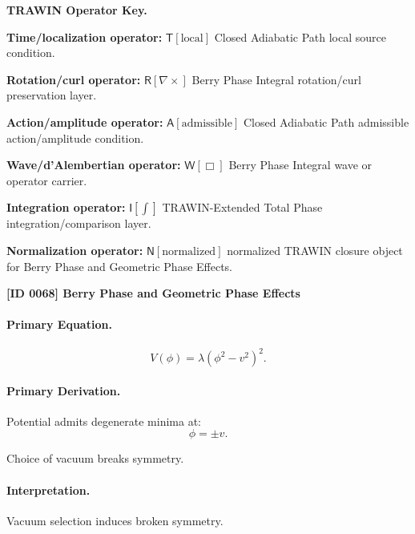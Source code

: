 \par\vspace{0.45\baselineskip}
\noindent\begin{minipage}[t]{\linewidth}
\begingroup
\small
\raggedright
\textbf{TRAWIN Operator Key.}\par
\noindent\textbf{Time/localization operator:} $\mathsf{T}\!\left[\mathrm{local}\right]$ Closed Adiabatic Path local source condition.\par
\noindent\textbf{Rotation/curl operator:} $\mathsf{R}\!\left[\nabla\times\right]$ Berry Phase Integral rotation/curl preservation layer.\par
\noindent\textbf{Action/amplitude operator:} $\mathsf{A}\!\left[\mathrm{admissible}\right]$ Closed Adiabatic Path admissible action/amplitude condition.\par
\noindent\textbf{Wave/d'Alembertian operator:} $\mathsf{W}\!\left[\Box\right]$ Berry Phase Integral wave or operator carrier.\par
\noindent\textbf{Integration operator:} $\mathsf{I}\!\left[\int\right]$ TRAWIN-Extended Total Phase integration/comparison layer.\par
\noindent\textbf{Normalization operator:} $\mathsf{N}\!\left[\mathrm{normalized}\right]$ normalized TRAWIN closure object for Berry Phase and Geometric Phase Effects.\par
\endgroup
\end{minipage}

\clearpage
\noindent\textbf{[ID 0068] Berry Phase and Geometric Phase Effects}\par
\vspace{0.35em}
\paragraph{Primary Equation.}
\begin{equation}
V(\phi) = \lambda(\phi^2 - v^2)^2.
\end{equation}

\paragraph{Primary Derivation.}
Potential admits degenerate minima at:
\begin{equation}
\phi = \pm v.
\end{equation}

Choice of vacuum breaks symmetry.

\paragraph{Interpretation.}
Vacuum selection induces broken symmetry.

